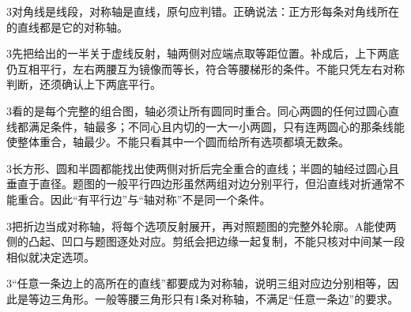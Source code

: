 \documentclass[multi=snippet,border={5bp 20bp 5bp 5bp}]{standalone}
\newenvironment{snippet}[3]{\begin{minipage}{#1bp}\color{answerred}\fontsize{#2}{#3}\selectfont\raggedright}{\end{minipage}}
\begin{document}
\begin{snippet}{505}{11.5}{14}\begin{multicols}{3}\raggedcolumns 对角线是线段，对称轴是直线，原句应判错。正确说法：正方形每条对角线所在的直线都是它的对称轴。\end{multicols}\end{snippet}
\begin{snippet}{505}{11.5}{14}\begin{multicols}{3}\raggedcolumns 先把给出的一半关于虚线反射，轴两侧对应端点取等距位置。补成后，上下两底仍互相平行，左右两腰互为镜像而等长，符合等腰梯形的条件。不能只凭左右对称判断，还须确认上下两底平行。\end{multicols}\end{snippet}
\begin{snippet}{505}{11.5}{14}\begin{multicols}{3}\raggedcolumns 看的是每个完整的组合图，轴必须让所有圆同时重合。同心两圆的任何过圆心直线都满足条件，轴最多；不同心且内切的一大一小两圆，只有连两圆心的那条线能使整体重合，轴最少。不能只看其中一个圆而给所有选项都填无数条。\end{multicols}\end{snippet}
\begin{snippet}{505}{11.5}{14}\begin{multicols}{3}\raggedcolumns 长方形、圆和半圆都能找出使两侧对折后完全重合的直线；半圆的轴经过圆心且垂直于直径。题图的一般平行四边形虽然两组对边分别平行，但沿直线对折通常不能重合。因此“有平行边”与“轴对称”不是同一个条件。\end{multicols}\end{snippet}
\begin{snippet}{505}{11.5}{14}\begin{multicols}{3}\raggedcolumns 把折边当成对称轴，将每个选项反射展开，再对照题图的完整外轮廓。A能使两侧的凸起、凹口与题图逐处对应。剪纸会把边缘一起复制，不能只核对中间某一段相似就决定选项。\end{multicols}\end{snippet}
\begin{snippet}{505}{11.5}{14}\begin{multicols}{3}\raggedcolumns “任意一条边上的高所在的直线”都要成为对称轴，说明三组对应边分别相等，因此是等边三角形。一般等腰三角形只有1条对称轴，不满足“任意一条边”的要求。\end{multicols}\end{snippet}
\end{document}
